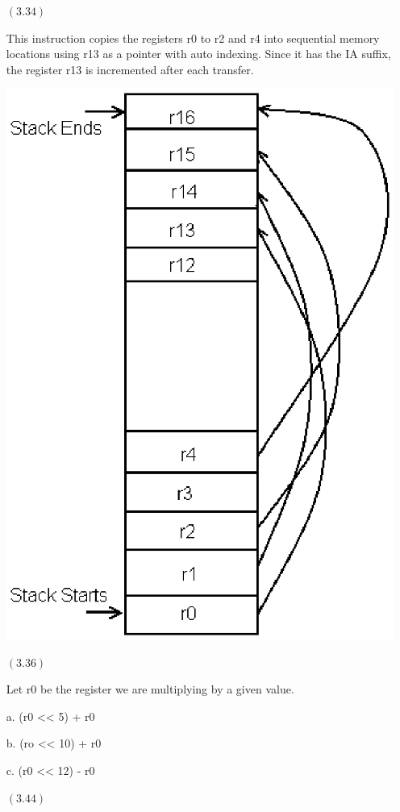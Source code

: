 \documentclass[letterpaper,10pt,titlepage]{article}
\begin{document}
\begin{enumerate}
\item[$(3.34)$]

  This instruction copies the registers r0 to r2 and r4 into sequential memory locations using r13 as a pointer with auto indexing. 
  Since it has the IA suffix, the register r13 is incremented after each transfer.


\includegraphics[scale=.5]{stack.eps}


\item[$(3.36)$] 

  Let r0 be the register we are multiplying by a given value.
  
  a. (r0 << 5) + r0
  
  b. (ro << 10) + r0
  
  c. (r0 << 12) - r0 

\item[$(3.44)$]


\end{enumerate}
\end{document}
